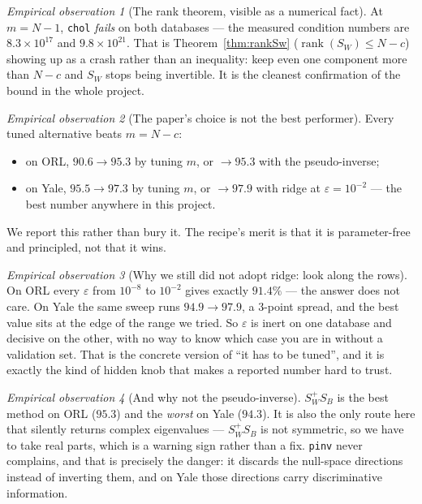 \documentclass[11pt]{article}
\theoremstyle{definition}
\theoremstyle{remark}
\newtheorem*{observation}{Empirical observation}
\newcommand{\Sw}{S_W}
\newcommand{\Sb}{S_B}
\newcommand{\rank}{\operatorname{rank}}
\begin{document}
\begin{observation}[The rank theorem, visible as a numerical fact]
At $m=N-1$, \texttt{chol} \emph{fails} on both databases --- the measured condition
numbers are $8.3\times10^{17}$ and $9.8\times10^{21}$. That is
Theorem~\ref{thm:rankSw} ($\rank(\Sw)\le N-c$) showing up as a crash rather than
an inequality: keep even one component more than $N-c$ and $\Sw$ stops being
invertible. It is the cleanest confirmation of the bound in the whole project.
\end{observation}

\begin{observation}[The paper's choice is not the best performer]
Every tuned alternative beats $m=N-c$:
\begin{itemize}[nosep]
\item on ORL, $90.6 \to 95.3$ by tuning $m$, or $\to 95.3$ with the pseudo-inverse;
\item on Yale, $95.5 \to 97.3$ by tuning $m$, or $\to \mathbf{97.9}$ with ridge at
      $\varepsilon=10^{-2}$ --- the best number anywhere in this project.
\end{itemize}
We report this rather than bury it. The recipe's merit is that it is
parameter-free and principled, not that it wins.
\end{observation}

\begin{observation}[Why we still did not adopt ridge: look along the rows]
On ORL every $\varepsilon$ from $10^{-8}$ to $10^{-2}$ gives exactly $91.4\%$ ---
the answer does not care. On Yale the same sweep runs $94.9 \to 97.9$, a
3-point spread, and the best value sits at the edge of the range we tried. So
$\varepsilon$ is inert on one database and decisive on the other, with no way to
know which case you are in without a validation set. That is the concrete version
of ``it has to be tuned'', and it is exactly the kind of hidden knob that makes a
reported number hard to trust.
\end{observation}

\begin{observation}[And why not the pseudo-inverse]
$\Sw^{+}\Sb$ is the best method on ORL ($95.3$) and the \emph{worst} on Yale
($94.3$). It is also the only route here that silently returns complex
eigenvalues --- $\Sw^{+}\Sb$ is not symmetric, so we have to take real parts, which
is a warning sign rather than a fix. \texttt{pinv} never complains, and that is
precisely the danger: it discards the null-space directions instead of inverting
them, and on Yale those directions carry discriminative information.
\end{observation}
\end{document}
